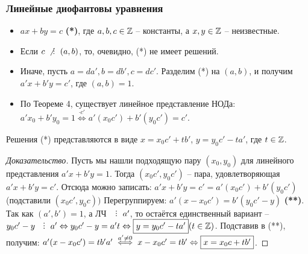 

\begin{frame}[t]
    \frametitle{\normalsize \bf Линейные диофантовы уравнения}
    \begin{itemize}
        \item $ax + by = c$ \textbf{(*)}, где  $a,b,c \in \mathbb{Z}$ -- константы, а $x, y \in \mathbb{Z}$ -- неизвестные.
        \item Если $c \nDiv \left( a,b \right)$, то, очевидно, (*) не имеет решений.
        \item Иначе, пусть $a = da', b = db', c = dc'$. Разделим (*) на $\left( a,b \right)$, и получим $a'x + b'y = c'$, где $\left( a,b \right) = 1$.
        \item По Теореме 4, существует линейное представление НОДа: $a'x_0 + b'y_0 = 1 \overset{\cdot c'} \Leftrightarrow a'(x_0c') + b'(y_0c') = c'$. 
    \end{itemize}

    \setcounter{theorem}{9}
    \begin{theorem}[]
        Решения (*) представляются в виде $x = x_0c' + tb'$, $y = y_0c' - ta'$, где $t \in \mathbb{Z}$.
    \end{theorem}
\end{frame}

\begin{frame}[t]
    \begin{proof}[Доказательство]
        Пусть мы нашли подходящую пару $\left( x_0, y_0 \right) $ для линейного представления $a'x + b'y = 1$. Тогда $\left( x_0c', y_0c' \right) $ -- пара, удовлетворяющая $a'x + b'y = c'$. Отсюда можно записать: $a'x + b'y = c' = a'(x_0c') + b'(y_0c') $ (подставили $\left( x_0c', y_0c \right)) $ Перегруппируем: $a'(x - x_0c') = b'(y_0c' - y)$ \textbf{(**)}. Так как $\left( a',b' \right) = 1$, а ЛЧ $\Div a'$, то остаётся единственный вариант --  $y_0c' - y \Div a' \Leftrightarrow y_0c' - y = a't \Leftrightarrow \fbox{$y = y_0c' - ta'$} (t \in \Z)$. Подставив в (**), получим: $a'(x - x_0c') = tb'a' \overset{a' \neq 0} \iff x - x_0c' = tb' \Leftrightarrow \fbox{$x = x_0c + tb'$}$.
    \end{proof}
    
\end{frame}




